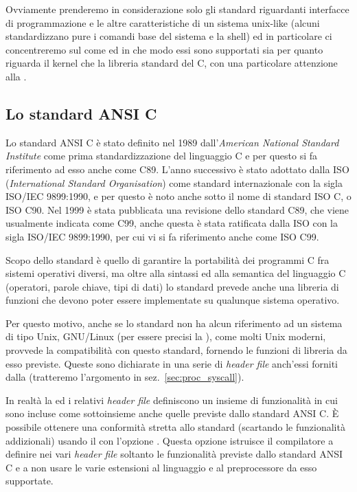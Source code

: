 Ovviamente prenderemo in considerazione solo gli standard riguardanti
interfacce di programmazione e le altre caratteristiche di un sistema
unix-like (alcuni standardizzano pure i comandi base del sistema e la shell)
ed in particolare ci concentreremo sul come ed in che modo essi sono
supportati sia per quanto riguarda il kernel che la libreria standard del C,
con una particolare attenzione alla .


\subsection{Lo standard ANSI C}
\label{sec:intro_ansiC}

Lo standard ANSI C è stato definito nel 1989 dall'\textit{American National
  Standard Institute} come prima standardizzazione del linguaggio C e per
questo si fa riferimento ad esso anche come C89. L'anno successivo è stato
adottato dalla ISO (\textit{International Standard Organisation}) come
standard internazionale con la sigla ISO/IEC 9899:1990, e per questo è noto
anche sotto il nome di standard ISO C, o ISO C90.  Nel 1999 è stata pubblicata
una revisione dello standard C89, che viene usualmente indicata come C99,
anche questa è stata ratificata dalla ISO con la sigla ISO/IEC 9899:1990, per
cui vi si fa riferimento anche come ISO C99.

Scopo dello standard è quello di garantire la portabilità dei programmi C fra
sistemi operativi diversi, ma oltre alla sintassi ed alla semantica del
linguaggio C (operatori, parole chiave, tipi di dati) lo standard prevede
anche una libreria di funzioni che devono poter essere implementate su
qualunque sistema operativo.

Per questo motivo, anche se lo standard non ha alcun riferimento ad un sistema
di tipo Unix, GNU/Linux (per essere precisi la ), come molti Unix
moderni, provvede la compatibilità con questo standard, fornendo le funzioni
di libreria da esso previste. Queste sono dichiarate in una serie di
\textit{header file} anch'essi forniti dalla  (tratteremo
l'argomento in sez.~\ref{sec:proc_syscall}).

In realtà la  ed i relativi \textit{header file} definiscono un
insieme di funzionalità in cui sono incluse come sottoinsieme anche quelle
previste dallo standard ANSI C. È possibile ottenere una conformità stretta
allo standard (scartando le funzionalità addizionali) usando il  con
l'opzione . Questa opzione istruisce il compilatore a definire nei
vari \textit{header file} soltanto le funzionalità previste dallo standard
ANSI C e a non usare le varie estensioni al linguaggio e al preprocessore da
esso supportate.


